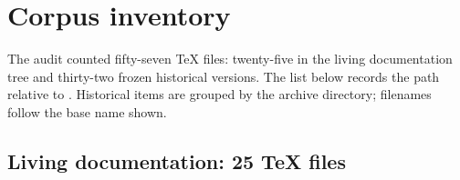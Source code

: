 \documentclass[11pt,oneside]{article}
\theoremstyle{definition}
\theoremstyle{remark}
\begin{document}
\appendix

\section{Corpus inventory}\label{app:inventory}

The audit counted fifty-seven TeX files: twenty-five in the living documentation
tree and thirty-two frozen historical versions. The list below records the path
relative to . Historical items are grouped by
the archive directory; filenames follow the base name shown.

\subsection{Living documentation: 25 TeX files}
\end{document}
